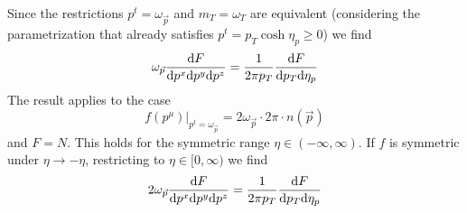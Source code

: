 Since the restrictions $p^t=\omega_{\vec{p}}$ and $m_T=\omega_T$ are equivalent (considering the parametrization that already satisfies $p^t=p_T\cosh\eta_p\geq 0$) we find
\begin{equation}
    \omega_{\vec{p}}\frac{\text{d} F}{\text{d} p^x\text{d} p^y\text{d} p^z}=\frac{1}{2\pi p_T}\frac{\text{d} F}{\text{d} p_T\text{d}\eta_p}
\end{equation}
The result applies to the case
\begin{equation}
    f(p^\mu)\big\vert_{p^t=\omega_{\vec{p}}}=2\omega_{\vec{p}}\cdot 2\pi\cdot n(\vec{p})
\end{equation}
and $F=N$. This holds for the symmetric range $\eta\in(-\infty,\infty)$. If $f$ is symmetric under ${\eta\to -\eta}$, restricting to $\eta\in[0,\infty)$ we find
\begin{equation}
    2\omega_{\vec{p}}\frac{\text{d} F}{\text{d} p^x\text{d} p^y\text{d} p^z}=\frac{1}{2\pi p_T}\frac{\text{d} F}{\text{d} p_T\text{d}\eta_p}
\end{equation}